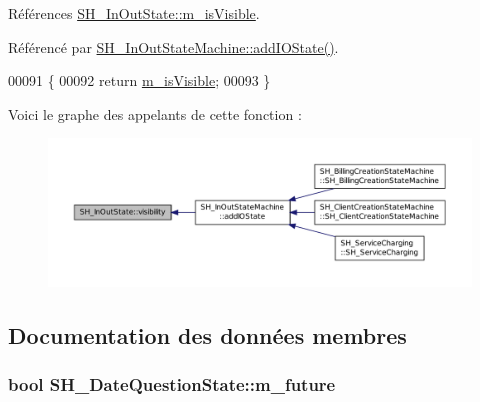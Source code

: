 Références \hyperlink{classSH__InOutState_a8fd66b185c9a55f0e84daa97e2acf53a}{S\-H\-\_\-\-In\-Out\-State\-::m\-\_\-is\-Visible}.



Référencé par \hyperlink{classSH__InOutStateMachine_ad6b778d052f741daee720c047059ce0e}{S\-H\-\_\-\-In\-Out\-State\-Machine\-::add\-I\-O\-State()}.


\begin{DoxyCode}
00091                                \{
00092     \textcolor{keywordflow}{return} \hyperlink{classSH__InOutState_a8fd66b185c9a55f0e84daa97e2acf53a}{m\_isVisible};
00093 \}
\end{DoxyCode}


Voici le graphe des appelants de cette fonction \-:\nopagebreak
\begin{figure}[H]
\begin{center}
\leavevmode
\includegraphics[width=350pt]{classSH__InOutState_a8c496b2fe21a51a587c6e4409c0f37ec_icgraph}
\end{center}
\end{figure}




\subsection{Documentation des données membres}
\hypertarget{classSH__DateQuestionState_a0a1577dc70f9c1120a6d623f8eb635c8}{
\subsubsection[{m\-\_\-future}]{\setlength{\rightskip}{0pt plus 5cm}bool S\-H\-\_\-\-Date\-Question\-State\-::m\-\_\-future\hspace{0.3cm}{\ttfamily [private]}}}\label{classSH__DateQuestionState_a0a1577dc70f9c1120a6d623f8eb635c8}


